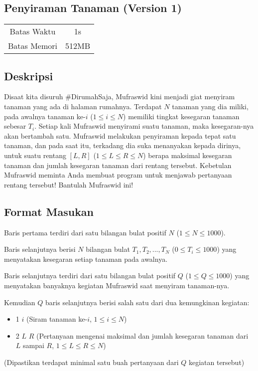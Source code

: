 \documentclass{article}
\begin{document}
\begin{center}
    \section*{Penyiraman Tanaman (Version 1)} %

    \begin{tabular}{ | c c | }
        \hline
        Batas Waktu  & 1s \\    %
        Batas Memori & 512MB \\  %
        \hline
    \end{tabular}
\end{center}

\subsection*{Deskripsi}

Disaat kita disuruh \#DirumahSaja, Mufraswid kini menjadi giat menyiram tanaman yang ada di halaman rumahnya. Terdapat $N$ tanaman yang dia miliki, pada awalnya tanaman ke-$i$ ($1 \leq i \leq N$) memiliki tingkat kesegaran tanaman sebesar $T_i$. Setiap kali Mufraswid menyirami suatu tanaman, maka kesegaran-nya akan bertambah satu. Mufraswid melakukan penyiraman kepada tepat satu tanaman, dan pada saat itu, terkadang dia suka menanyakan kepada dirinya, untuk suatu rentang $\left[L, R \right]$ ($1 \leq L \leq R \leq N$) berapa maksimal kesegaran tanaman dan jumlah kesegaran tanaman dari rentang tersebut. Kebetulan Mufraswid meminta Anda membuat program untuk menjawab pertanyaan rentang tersebut! Bantulah Mufraswid ini!

\subsection*{Format Masukan}

Baris pertama terdiri dari satu bilangan bulat positif $N$ ($1 \leq N \leq 1000$).

Baris selanjutnya berisi $N$ bilangan bulat $T_1, T_2, ..., T_N$ ($0 \leq T_i \leq 1000$) yang menyatakan kesegaran setiap tanaman pada awalnya.

Baris selanjutnya terdiri dari satu bilangan bulat positif $Q$ ($1 \leq Q \leq 1000$) yang menyatakan banyaknya kegiatan Mufraswid saat menyiram tanaman-nya.

Kemudian $Q$ baris selanjutnya berisi salah satu dari dua kemungkinan kegiatan:
\vspace{-\baselineskip}
\begin{itemize}
    \setlength\itemsep{0pt}
	\item 1 $i$ (Siram tanaman ke-$i$, $1 \leq i \leq N$)
	\item 2 $L$ $R$ (Pertanyaan mengenai maksimal dan jumlah kesegaran tanaman dari $L$ sampai $R$, $1 \leq L \leq R \leq N$)
\end{itemize}
\vspace{-\baselineskip}
(Dipastikan terdapat minimal satu buah pertanyaan dari $Q$ kegiatan tersebut)
\end{document}
